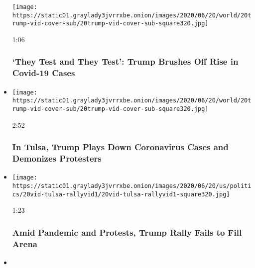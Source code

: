 \begin{itemize}
  \texttt{[image: https://static01.graylady3jvrrxbe.onion/images/2020/06/20/world/20trump-vid-cover-sub/20trump-vid-cover-sub-square320.jpg]}

  1:06

  \hypertarget{they-test-and-they-test-trump-brushes-off-rise-in-covid-19-cases}{%
  \subsubsection{`They Test and They Test': Trump Brushes Off Rise in
  Covid-19
  Cases}\label{they-test-and-they-test-trump-brushes-off-rise-in-covid-19-cases}}
\item
  \href{https://www.nytimes3xbfgragh.onion/video/us/politics/100000007202247/trump-tulsa-rally.html?action=click\&module=video-series-bar\&region=header\&pgtype=Article\&playlistId=video/2020-Elections}{}

  \texttt{[image: https://static01.graylady3jvrrxbe.onion/images/2020/06/20/world/20trump-vid-cover-sub/20trump-vid-cover-sub-square320.jpg]}

  2:52

  \hypertarget{in-tulsa-trump-plays-down-coronavirus-cases-and-demonizes-protesters}{%
  \subsubsection{In Tulsa, Trump Plays Down Coronavirus Cases and
  Demonizes
  Protesters}\label{in-tulsa-trump-plays-down-coronavirus-cases-and-demonizes-protesters}}
\item
  \href{https://www.nytimes3xbfgragh.onion/video/us/politics/100000007201990/trump-supporters-gather-in-tulsa-for-rally.html?action=click\&module=video-series-bar\&region=header\&pgtype=Article\&playlistId=video/2020-Elections}{}

  \texttt{[image: https://static01.graylady3jvrrxbe.onion/images/2020/06/20/us/politics/20vid-tulsa-rallyvid1/20vid-tulsa-rallyvid1-square320.jpg]}

  1:23

  \hypertarget{amid-pandemic-and-protests-trump-rally-fails-to-fill-arena}{%
  \subsubsection{Amid Pandemic and Protests, Trump Rally Fails to Fill
  Arena}\label{amid-pandemic-and-protests-trump-rally-fails-to-fill-arena}}
\item
  \href{https://www.nytimes3xbfgragh.onion/video/us/politics/100000007199618/trump-tulsa-rally-supporters-coronavirus.html?action=click\&module=video-series-bar\&region=header\&pgtype=Article\&playlistId=video/2020-Elections}{}


\end{itemize}
